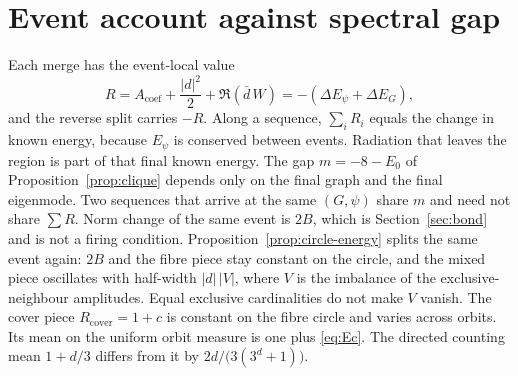 \section{Event account against spectral gap}
\label{sec:h-merge}

Each merge has the event-local value
\[
R=A_{\mathrm{coef}}+\frac{|d|^2}{2}+\Re(\bar d\, W)
=-(\Delta E_\psi+\Delta E_G),
\]
and the reverse split carries \(-R\).
Along a sequence, \(\sum_i R_i\) equals the change in known energy, because
\(E_\psi\) is conserved between events.
Radiation that leaves the region is part of that final known energy.
The gap \(m=-8-E_0\) of Proposition~\ref{prop:clique} depends only on the
final graph and the final eigenmode.
Two sequences that arrive at the same \((G,\psi)\) share \(m\) and need not
share \(\sum R\).
Norm change of the same event is \(2B\), which is Section~\ref{sec:bond}
and is not a firing condition.
Proposition~\ref{prop:circle-energy} splits the same event again:
\(2B\) and the fibre piece stay constant on the circle, and the mixed
piece oscillates with half-width \(|d|\,|V|\), where \(V\) is the
imbalance of the exclusive-neighbour amplitudes.
Equal exclusive cardinalities do not make \(V\) vanish.
The cover piece \(R_{\mathrm{cover}}=1+c\) is constant on the fibre circle
and varies across orbits.
Its mean on the uniform orbit measure is one plus \eqref{eq:Ec}.
The directed counting mean \(1+d/3\) differs from it by
\(2d/\bigl(3(3^d+1)\bigr)\).
